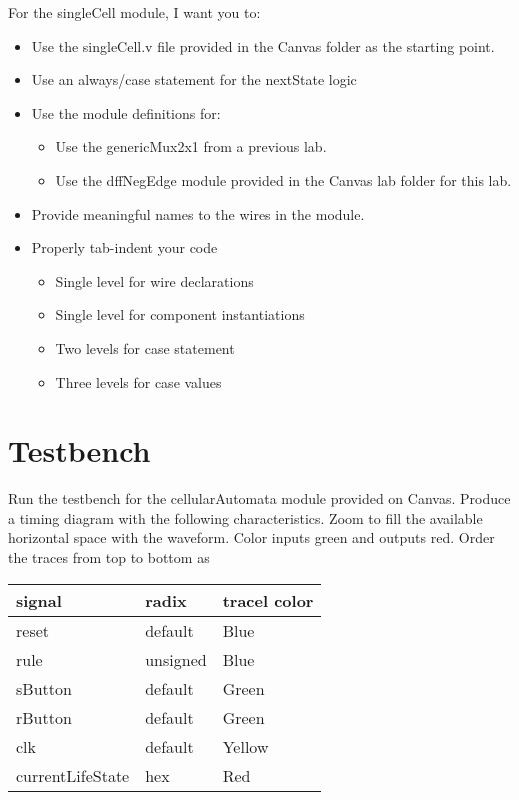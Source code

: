 \protect\hypertarget{singleCell_verilog}{}{}For the singleCell module, I
want you to:

\begin{itemize}
\item
Use the singleCell.v file provided in the Canvas folder as the
starting point.
\item
Use an always/case statement for the nextState logic
\item
Use the module definitions for:

\begin{itemize}
    \item
        Use the genericMux2x1 from a previous lab.
    \item
        Use the dffNegEdge module provided in the Canvas lab folder for this
        lab.
\end{itemize}
\item
Provide meaningful names to the wires in the module.
\item
Properly tab-indent your code

\begin{itemize}
    \item
        Single level for wire declarations
    \item
        Single level for component instantiations
    \item
        Two levels for case statement
    \item
        Three levels for case values
\end{itemize}
\end{itemize}

\section{Testbench}
\label{section:caTestbench}

Run the testbench for the cellularAutomata module provided on Canvas.
Produce a timing diagram with the following characteristics. Zoom to
fill the available horizontal space with the waveform. Color inputs
green and outputs red. Order the traces from top to bottom as

\begin{tabular}{p{4cm}p{4cm}p{4cm}}
signal        & radix                & tracel color \\ \hline
reset             & default             & Blue  \\
rule             &  unsigned             & Blue \\
sButton             & default         & Green \\
rButton             & default         & Green \\
clk                 & default         & Yellow \\
currentLifeState     & hex             & Red \\
\end{tabular}

